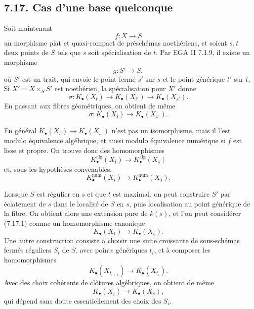 \documentclass[11pt]{article}
\begin{document}
\subsection*{7.17. Cas d'une base quelconque}
Soit maintenant
\[
  f:X\longrightarrow S
\]
un morphisme plat et quasi-compact de préschémas noethériens, et soient \(s,t\) deux points de \(S\) tels que \(s\) soit spécialisation de \(t\). Par EGA II 7.1.9, il existe un morphisme
\[
  g:S'\longrightarrow S,
\]
où \(S'\) est un trait, qui envoie le point fermé \(s'\) sur \(s\) et le point générique \(t'\) sur \(t\). Si \(X'=X\times_SS'\) est noethérien, la spécialisation pour \(X'\) donne
\begin{equation}\tag{7.17.1}
  \sigma:K_\bullet(X_t)\longrightarrow K_\bullet(X_{t'})
  \longrightarrow K_\bullet(X_{s'}).
\end{equation}
En passant aux fibres géométriques, on obtient de même
\begin{equation}\tag{7.17.2}
  \sigma:K_\bullet(X_{\bar t})\longrightarrow K_\bullet(X_{\bar s'}).
\end{equation}

En général \(K_\bullet(X_{\bar s})\to K_\bullet(X_{\bar s'})\) n'est pas un isomorphisme, mais il l'est modulo équivalence algébrique, et aussi modulo équivalence numérique si \(f\) est lisse et propre. On trouve donc des homomorphismes
\begin{equation}\tag{7.17.3.1}
  K^{\mathrm{alg}}_\bullet(X_{\bar t})\longrightarrow
  K^{\mathrm{alg}}_\bullet(X_{\bar s})
\end{equation}
et, sous les hypothèses convenables,
\begin{equation}\tag{7.17.3.2}
  K^{\mathrm{num}}_\bullet(X_{\bar t})\longrightarrow
  K^{\mathrm{num}}_\bullet(X_{\bar s}).
\end{equation}

Lorsque \(S\) est régulier en \(s\) et que \(t\) est maximal, on peut construire \(S'\) par éclatement de \(s\) dans le localisé de \(S\) en \(s\), puis localisation au point générique de la fibre. On obtient alors une extension pure de \(k(s)\), et l'on peut considérer (7.17.1) comme un homomorphisme canonique
\begin{equation}\tag{7.17.4.1}
  K_\bullet(X_t)\longrightarrow K_\bullet(X_s).
\end{equation}
Une autre construction consiste à choisir une suite croissante de sous-schémas fermés réguliers \(S_i\) de \(S\), avec points génériques \(t_i\), et à composer les homomorphismes
\[
  K_\bullet(X_{t_{i+1}})\longrightarrow K_\bullet(X_{t_i}).
\]
Avec des choix cohérents de clôtures algébriques, on obtient de même
\begin{equation}\tag{7.17.4.2}
  K_\bullet(X_{\bar t})\longrightarrow K_\bullet(X_{\bar s}),
\end{equation}
qui dépend sans doute essentiellement des choix des \(S_i\).
\end{document}
